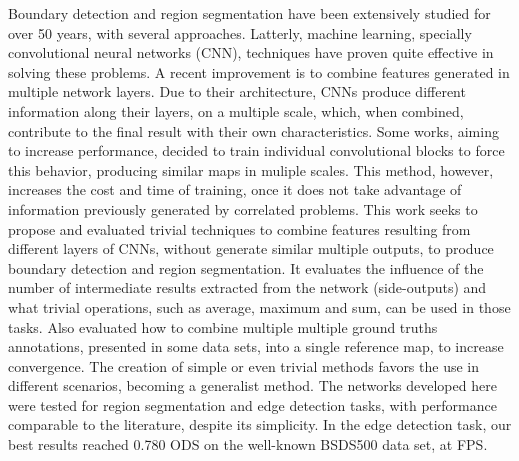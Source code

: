 Boundary detection and region segmentation have been extensively studied for over 50 years, with several approaches.
Latterly, machine learning, specially convolutional neural networks (CNN), techniques have proven quite effective in solving these problems.
A recent improvement is to combine features generated in multiple network layers. 
Due to their architecture, CNNs produce different information along their layers, on a multiple scale, which, when combined, contribute to the final result with their own characteristics.
Some works, aiming to increase performance, decided to train individual convolutional blocks to force this behavior, producing similar maps in muliple scales.
This method, however, increases the cost and time of training, once it does not take advantage of information previously generated by correlated problems.
This work seeks to propose and evaluated trivial techniques to combine features resulting from different layers of CNNs, without generate similar multiple outputs, to produce boundary detection and region segmentation. %
It evaluates the influence of the number of intermediate results extracted from the network (side-outputs) and what trivial operations, such as average, maximum and sum, can be used in those tasks.
Also evaluated how to combine multiple multiple ground truths annotations, presented in some data sets, into a single reference map, to increase convergence.
The creation of simple or even trivial methods favors the use in different scenarios, becoming a generalist method.
The networks developed here were tested for region segmentation and edge detection tasks, with performance comparable to the literature, despite its simplicity.
In the edge detection task, our best results reached 0.780 ODS on the well-known BSDS500 data set, at \myFPS FPS.
